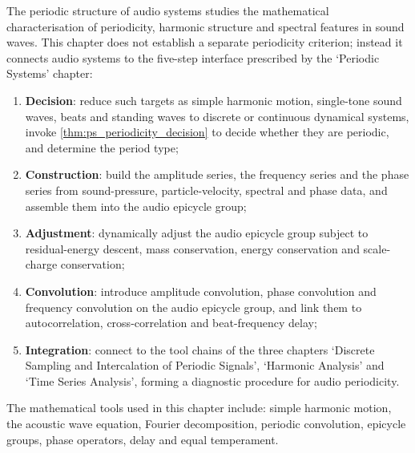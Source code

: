 \begin{remark}\label{rem:audio_five_steps_positioning}
The periodic structure of audio systems studies the mathematical characterisation of periodicity, harmonic structure and spectral features in sound waves. This chapter does not establish a separate periodicity criterion; instead it connects audio systems to the five-step interface prescribed by the `Periodic Systems' chapter:
\begin{enumerate}[label=(\arabic*)]
    \item \textbf{Decision}: reduce such targets as simple harmonic motion, single-tone sound waves, beats and standing waves to discrete or continuous dynamical systems, invoke \cref{thm:ps_periodicity_decision} to decide whether they are periodic, and determine the period type;
    \item \textbf{Construction}: build the amplitude series, the frequency series and the phase series from sound-pressure, particle-velocity, spectral and phase data, and assemble them into the audio epicycle group;
    \item \textbf{Adjustment}: dynamically adjust the audio epicycle group subject to residual-energy descent, mass conservation, energy conservation and scale-charge conservation;
    \item \textbf{Convolution}: introduce amplitude convolution, phase convolution and frequency convolution on the audio epicycle group, and link them to autocorrelation, cross-correlation and beat-frequency delay;
    \item \textbf{Integration}: connect to the tool chains of the three chapters `Discrete Sampling and Intercalation of Periodic Signals', `Harmonic Analysis' and `Time Series Analysis', forming a diagnostic procedure for audio periodicity.
\end{enumerate}
The mathematical tools used in this chapter include: simple harmonic motion, the acoustic wave equation, Fourier decomposition, periodic convolution, epicycle groups, phase operators, delay and equal temperament.
\end{remark}

